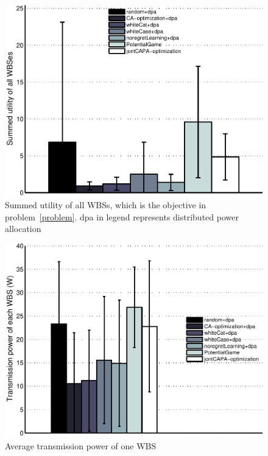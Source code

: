 \documentclass[times]{ettauth}
\theoremstyle{mytheoremstyle}
\theoremstyle{mytheoremstyle}
\theoremstyle{mytheoremstyle}
\begin{document}
\begin{figure}[h!]
  \centering
  \includegraphics[width=0.8\linewidth]{16.pdf}
  \caption{Summed utility of all WBSs, which is the objective in problem~\ref{problem}. dpa in legend represents distributed power allocation}
\label{CAPA_utility}
\end{figure}






\begin{figure}[h!]
  \centering
  \includegraphics[width=0.8\linewidth]{14.pdf}
  \caption{Average transmission power of one WBS}
\label{CAPA_power}
\end{figure}
%
%
\end{document}
